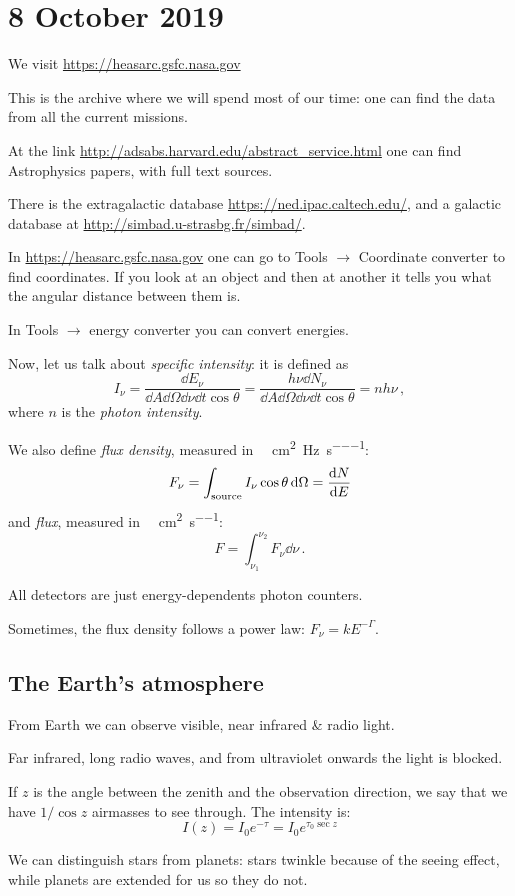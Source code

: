 \documentclass[main.tex]{subfiles}
\begin{document}
\section*{8 October 2019}

We visit \url{https://heasarc.gsfc.nasa.gov}

This is the archive where we will spend most of our time: one can find the data from all the current missions.

At the link \url{http://adsabs.harvard.edu/abstract_service.html} one can find Astrophysics papers, with full text sources.

There is the extragalactic database \url{https://ned.ipac.caltech.edu/}, and a galactic database at \url{http://simbad.u-strasbg.fr/simbad/}.

In \url{https://heasarc.gsfc.nasa.gov} one can go to Tools \(\rightarrow\) Coordinate converter to find coordinates.
If you look at an object and then at another it tells you what the angular distance between them is.

In Tools \(\rightarrow\) energy converter you can convert energies.

Now, let us talk about \emph{specific intensity}:
it is defined as
%
\begin{equation}
  I_\nu = \frac{\dd{E_\nu}}{\dd{A} \dd{\Omega} \dd{\nu} \dd{t} \cos \theta}
  = \frac{h\nu\dd{N_\nu}}{\dd{A} \dd{\Omega} \dd{\nu} \dd{t} \cos \theta}
  = nh\nu\,,
\end{equation}
%
where \(n\) is the \emph{photon intensity}.

We also define \emph{flux density}, measured in \SI{}{\erg\per\square\centi\meter\per\hertz\per\second}:
%
\begin{equation}
  F_\nu = \int_{\text{source}} I_\nu \cos \theta \dd{\Omega} = \dv{N}{E}
\end{equation}
%
and \emph{flux}, measured in \SI{}{\erg\per\square\centi\meter\per\second}:
%
\begin{equation}
  F = \int_{\nu_1}^{\nu_2} F_\nu \dd{\nu}\,.
\end{equation}

All detectors are just energy-dependents photon counters.

Sometimes, the flux density follows a power law: \(F_\nu = k E^{-\Gamma}\).

\subsection{The Earth's atmosphere}

From Earth we can observe visible, near infrared \& radio light.

Far infrared, long radio waves, and from ultraviolet onwards the light is blocked.

If \(z\) is the angle between the zenith and the observation direction, we say that we have \(1 / \cos z \) airmasses to see through.
The intensity is:
%
\begin{equation}
  I(z) = I_0 e^{-\tau} = I_0 e^{\tau_0 \sec z}
\end{equation}

We can distinguish stars from planets: stars twinkle because of the seeing effect, while planets are extended for us so they do not.
\end{document}
